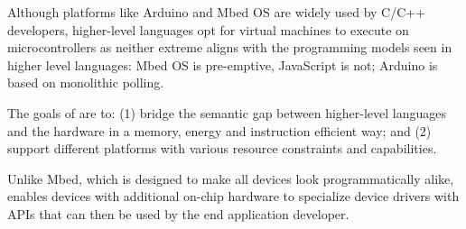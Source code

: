 Although platforms like Arduino and Mbed OS are widely used by C/C++ developers, 
higher-level languages opt for virtual machines to execute on microcontrollers 
as neither extreme aligns with the programming models seen in higher level languages: 
Mbed OS is pre-emptive, JavaScript is not; Arduino is based on monolithic polling. 

The goals of \CO are to: (1) bridge the semantic gap between 
higher-level languages and the hardware in a memory, energy and instruction 
efficient way; and (2) support different platforms with various
resource constraints and capabilities.

Unlike Mbed, which is designed to make all devices look programmatically alike,
\CO enables devices with additional on-chip hardware to specialize device drivers 
with APIs that can then be used by the end application developer.


